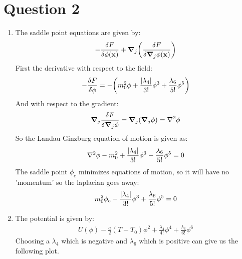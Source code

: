 \documentclass[12pt]{article}
\begin{document}
\section*{Question 2}
\begin{enumerate}
\item The saddle point equations are given by:
  \begin{align*}
    -\fdv{F}{\phi(\vb{x})}+\grad_j\qty(\fdv{F}{\grad_j\phi(\vb{x})})
  \end{align*}
  First the derivative with respect to the field:
  \begin{align*}
    -\fdv{F}{\phi}=-\qty(m_0^2\phi
    +\frac{\abs{\lambda_4}}{3!}\phi^3
    +\frac{\lambda_6}{5!}\phi^5)
  \end{align*}
  And with respect to the gradient:
  \begin{align*}
    \grad_j\fdv{F}{\grad_j\phi}=\grad_j\qty(\grad_j\phi)=\laplacian{\phi}
  \end{align*}
  So the Landau-Ginzburg equation of motion is given as:
  \begin{align*}
    \laplacian{\phi}-m_0^2+\frac{\abs{\lambda_4}}{3!}\phi^3
    -\frac{\lambda_6}{5!}\phi^5=0
  \end{align*}
  The saddle point $\phi_c$ minimizes equations of motion, so it will have no 'momentum' so the laplacian goes away:
  \begin{align*}
    m_0^2\phi_c-\frac{\abs{\lambda_4}}{3!}\phi^3+\frac{\lambda_6}{5!}\phi^5=0
  \end{align*}
\item The potential is given by:
  \begin{align*}
    U(\phi)-\frac{a}{2}(T-T_0)\phi^2+\frac{\lambda_4}{4!}\phi^4
    +\frac{\lambda_6}{6!}\phi^6
  \end{align*}
  Choosing a $\lambda_4$ which is negative and $\lambda_6$ which is positive can give us the following plot. 
\end{enumerate}
\end{document}
